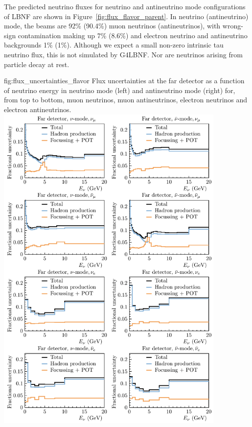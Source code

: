 The predicted neutrino fluxes for neutrino and antineutrino mode configurations of LBNF are shown in Figure~\ref{fig:flux_flavor_parent}.  In neutrino (antineutrino) mode, the beams are 92\% (90.4\%) muon neutrinos (antineutrinos), with wrong-sign contamination making up 7\% (8.6\%) and electron neutrino and antineutrino backgrounds 1\% (1\%).  Although %
we expect a small non-zero intrinsic tau neutrino flux, this is not simulated by G4LBNF.  Nor are neutrinos arising from particle decay at rest. %

\begin{dunefigure}{fig:flux_uncertainties_flavor}
{Flux uncertainties at the far detector as a function of neutrino energy in neutrino mode (left) and antineutrino mode (right) for, from top to bottom, muon neutrinos, muon antineutrinos, electron neutrinos and electron antineutrinos. }
    \includegraphics[width=0.85\textwidth]{graphics/HP_NonHP_FD_allspec_ErrBreakdown.pdf}

\end{dunefigure}
